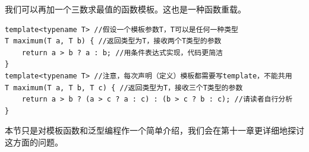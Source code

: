我们可以再加一个三数求最值的函数模板。这也是一种函数重载。
\begin{lstlisting}
template<typename T> //假设一个模板参数T，T可以是任何一种类型
T maximum(T a, T b) { //返回类型为T，接收两个T类型的参数
    return a > b ? a : b; //用条件表达式实现，代码更简洁
}
template<typename T> //注意，每次声明（定义）模板都需要写template，不能共用
T maximum(T a, T b, T c) { //返回类型为T，接收三个T类型的参数
    return a > b ? (a > c ? a : c) : (b > c ? b : c); //请读者自行分析
}
\end{lstlisting}
本节只是对模板函数和泛型编程作一个简单介绍，我们会在第十一章更详细地探讨这方面的问题。\par
